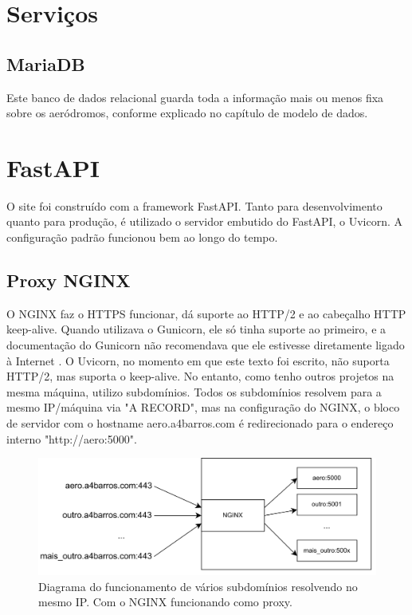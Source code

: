 \section{Serviços}

\subsection{MariaDB}
Este banco de dados relacional guarda toda a informação mais ou menos fixa sobre os aeródromos,
conforme explicado no capítulo de modelo de dados.

\section{FastAPI}

O site foi construído com a framework FastAPI. Tanto para desenvolvimento quanto para produção, 
é utilizado o servidor embutido do FastAPI, o Uvicorn. A configuração padrão funcionou bem ao
longo do tempo.

\subsection{Proxy NGINX}
O NGINX faz o HTTPS funcionar, dá suporte ao HTTP/2 e ao cabeçalho HTTP keep-alive. Quando
utilizava o Gunicorn, ele só tinha suporte ao primeiro, e a documentação do Gunicorn não
recomendava que ele estivesse diretamente ligado à Internet \cite{nginx-gunicorn}. O Uvicorn,
no momento em que este texto foi escrito, não suporta HTTP/2, mas suporta o keep-alive. No
entanto, como tenho outros projetos na mesma máquina, utilizo subdomínios. Todos os subdomínios
resolvem para a mesmo IP/máquina via "A RECORD", mas na configuração
do NGINX, o bloco de servidor com o hostname aero.a4barros.com é redirecionado para o
endereço interno "http://aero:5000".


\begin{figure}[ht]
    \begin{center}
    \includegraphics[width=400pt]{img/arquit.png}
    \caption{Diagrama do funcionamento de vários subdomínios resolvendo no mesmo IP. Com o NGINX funcionando como proxy.}
    \label{fig:sbrf-plot}
    \end{center}
\end{figure}

